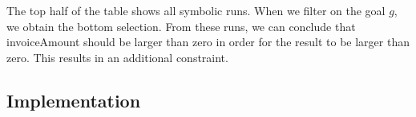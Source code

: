 The top half of the table shows all symbolic runs.
When we filter on the goal $g$, we obtain the bottom selection.
From these runs, we can conclude that invoiceAmount should be larger than zero in order for the result to be larger than zero. This results in an additional constraint.
%


\subsection{Implementation}
\label{sec:implementation}


